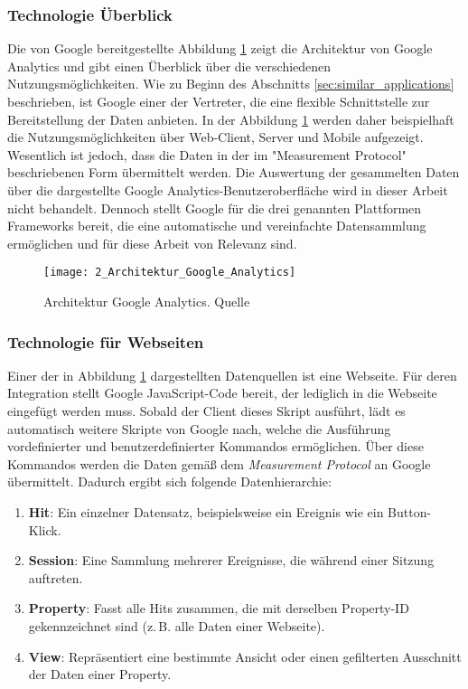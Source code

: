 \subsubsection{Technologie Überblick}
Die von Google bereitgestellte Abbildung \ref{fig:googel_analytics_architecture} zeigt die Architektur von Google Analytics und gibt einen Überblick über die verschiedenen Nutzungsmöglichkeiten. Wie zu Beginn des Abschnitts \ref{sec:similar_applications} beschrieben, ist Google einer der Vertreter, die eine flexible Schnittstelle zur Bereitstellung der Daten anbieten. In der Abbildung \ref{fig:googel_analytics_architecture} werden daher beispielhaft die Nutzungsmöglichkeiten über Web-Client, Server und Mobile aufgezeigt.
Wesentlich ist jedoch, dass die Daten in der im "Measurement Protocol" \cite{google_developers_sending_events} beschriebenen Form übermittelt werden. Die Auswertung der gesammelten Daten über die dargestellte Google Analytics-Benutzeroberfläche wird in dieser Arbeit nicht behandelt. Dennoch stellt Google für die drei genannten Plattformen Frameworks bereit, die eine automatische und vereinfachte Datensammlung ermöglichen und für diese Arbeit von Relevanz sind.

\begin{figure}[h]
\centering
\texttt{[image: 2\_Architektur\_Google\_Analytics]}
\caption{Architektur Google Analytics. Quelle \cite{google_developers_sending_events}}
\label{fig:googel_analytics_architecture}
\end{figure}

\subsubsection{Technologie für Webseiten}
Einer der in Abbildung \ref{fig:googel_analytics_architecture} dargestellten Datenquellen ist eine Webseite. 
Für deren Integration stellt Google JavaScript-Code bereit, der lediglich in die Webseite eingefügt werden muss. 
Sobald der Client dieses Skript ausführt, lädt es automatisch weitere Skripte von Google nach, welche die Ausführung vordefinierter und benutzerdefinierter Kommandos ermöglichen. 
Über diese Kommandos werden die Daten gemäß dem \textit{Measurement Protocol} \cite{google_developers_sending_events} an Google übermittelt. 
Dadurch ergibt sich folgende Datenhierarchie:

\begin{enumerate}
    \item \textbf{Hit}: Ein einzelner Datensatz, beispielsweise ein Ereignis wie ein Button-Klick.
    \item \textbf{Session}: Eine Sammlung mehrerer Ereignisse, die während einer Sitzung auftreten.
    \item \textbf{Property}: Fasst alle Hits zusammen, die mit derselben Property-ID gekennzeichnet sind (z.\,B. alle Daten einer Webseite).
    \item \textbf{View}: Repräsentiert eine bestimmte Ansicht oder einen gefilterten Ausschnitt der Daten einer Property.
\end{enumerate}

